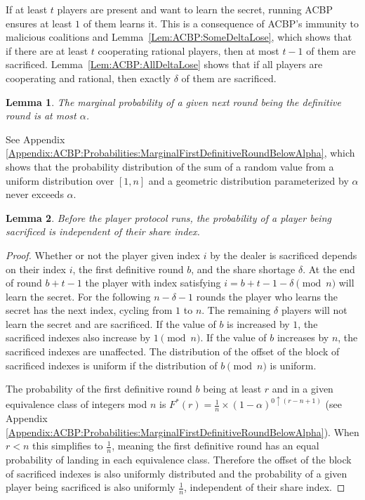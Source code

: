 \documentclass[12pt]{article}
\newtheorem{lemma}{Lemma}
\begin{document}
If at least $t$ players are present and want to learn the secret, running ACBP ensures at least $1$ of them learns it. This is a consequence of ACBP's immunity to malicious coalitions and Lemma~\ref{Lem:ACBP:SomeDeltaLose}, which shows that if there are at least $t$ cooperating rational players, then at most $t-1$ of them are sacrificed. Lemma~\ref{Lem:ACBP:AllDeltaLose} shows that if all players are cooperating and rational, then exactly $\delta$ of them are sacrificed.

\begin{lemma}\label{Lem:ABPC:MarginalAtMostAlpha}The marginal probability of a given next round being the definitive round is at most $\alpha$.\end{lemma}
See Appendix \ref{Appendix:ACBP:Probabilities:MarginalFirstDefinitiveRoundBelowAlpha}, which shows that the probability distribution of the sum of a random value from a uniform distribution over $[1,n]$ and a geometric distribution parameterized by $\alpha$ never exceeds $\alpha$.

\begin{lemma}\label{Lem:ACBP:FairSacrificeBefore}Before the player protocol runs, the probability of a player being sacrificed is independent of their share index.\end{lemma}
\begin{proof}
Whether or not the player given index $i$ by the dealer is sacrificed depends on their index $i$, the first definitive round $b$, and the share shortage $\delta$. At the end of round $b+t-1$ the player with index satisfying $i = b+t-1-\delta \pmod{n}$ will learn the secret. For the following $n-\delta-1$ rounds the player who learns the secret has the next index, cycling from $1$ to $n$. The remaining $\delta$ players will not learn the secret and are sacrificed. If the value of $b$ is increased by $1$, the sacrificed indexes also increase by $1 \pmod{n}$. If the value of $b$ increases by $n$, the sacrificed indexes are unaffected. The distribution of the offset of the block of sacrificed indexes is uniform if the distribution of $b \pmod{n}$ is uniform.

The probability of the first definitive round $b$ being at least $r$ and in a given equivalence class of integers mod $n$ is $F^{*}(r) = \frac{1}{n} \times (1-\alpha)^{0 \uparrow (r - n + 1)}$ (see Appendix \ref{Appendix:ACBP:Probabilities:MarginalFirstDefinitiveRoundBelowAlpha}). When $r < n$ this simplifies to $\frac{1}{n}$, meaning the first definitive round has an equal probability of landing in each equivalence class. Therefore the offset of the block of sacrificed indexes is also uniformly distributed and the probability of a given player being sacrificed is also uniformly $\frac{1}{n}$, independent of their share index.
\end{proof}
\end{document}
